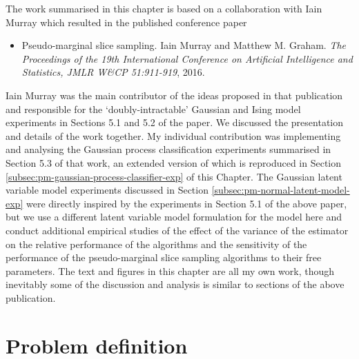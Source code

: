 The work summarised in this chapter is based on a collaboration with Iain Murray which resulted in the published conference paper
\begin{itemize}
 \item Pseudo-marginal slice sampling. Iain Murray and Matthew M. Graham. \emph{The Proceedings of the 19th International Conference on Artificial Intelligence and Statistics, JMLR W\&CP 51:911-919}, 2016.
\end{itemize}
Iain Murray was the main contributor of the ideas proposed in that publication and responsible for the `doubly-intractable' Gaussian and Ising model experiments in Sections 5.1 and 5.2 of the paper. We discussed the presentation and details of the work together. My individual contribution was implementing and analysing the Gaussian process classification experiments summarised in Section 5.3 of that work, an extended version of which is reproduced in Section \ref{subsec:pm-gaussian-process-classifier-exp} of this Chapter. The Gaussian latent variable model experiments discussed in Section \ref{subsec:pm-normal-latent-model-exp} were directly inspired by the experiments in Section 5.1 of the above paper, but we use a different latent variable model formulation for the model here and conduct additional empirical studies of the effect of the variance of the estimator on the relative performance of the algorithms and the sensitivity of the performance of the pseudo-marginal slice sampling algorithms to their free parameters. The text and figures in this chapter are all my own work, though inevitably some of the discussion and analysis is similar to sections of the above publication.


\section{Problem definition}

